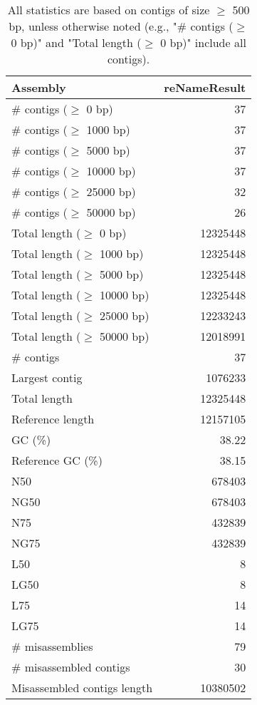 \documentclass[12pt,a4paper]{article}
\begin{document}
\begin{table}[ht]
\begin{center}
\caption{All statistics are based on contigs of size $\geq$ 500 bp, unless otherwise noted (e.g., "\# contigs ($\geq$ 0 bp)" and "Total length ($\geq$ 0 bp)" include all contigs).}
\begin{tabular}{|l*{1}{|r}|}
\hline
Assembly & reNameResult \\ \hline
\# contigs ($\geq$ 0 bp) & 37 \\ \hline
\# contigs ($\geq$ 1000 bp) & 37 \\ \hline
\# contigs ($\geq$ 5000 bp) & 37 \\ \hline
\# contigs ($\geq$ 10000 bp) & 37 \\ \hline
\# contigs ($\geq$ 25000 bp) & 32 \\ \hline
\# contigs ($\geq$ 50000 bp) & 26 \\ \hline
Total length ($\geq$ 0 bp) & 12325448 \\ \hline
Total length ($\geq$ 1000 bp) & 12325448 \\ \hline
Total length ($\geq$ 5000 bp) & 12325448 \\ \hline
Total length ($\geq$ 10000 bp) & 12325448 \\ \hline
Total length ($\geq$ 25000 bp) & 12233243 \\ \hline
Total length ($\geq$ 50000 bp) & 12018991 \\ \hline
\# contigs & 37 \\ \hline
Largest contig & 1076233 \\ \hline
Total length & 12325448 \\ \hline
Reference length & 12157105 \\ \hline
GC (\%) & 38.22 \\ \hline
Reference GC (\%) & 38.15 \\ \hline
N50 & 678403 \\ \hline
NG50 & 678403 \\ \hline
N75 & 432839 \\ \hline
NG75 & 432839 \\ \hline
L50 & 8 \\ \hline
LG50 & 8 \\ \hline
L75 & 14 \\ \hline
LG75 & 14 \\ \hline
\# misassemblies & 79 \\ \hline
\# misassembled contigs & 30 \\ \hline
Misassembled contigs length & 10380502 \\ \hline

\end{tabular}
\end{center}
\end{table}
\end{document}
